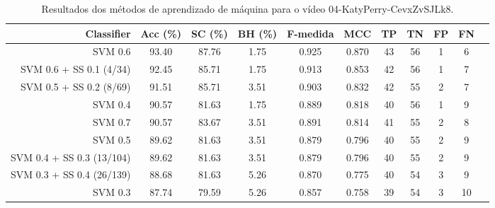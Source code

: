 \begin{table}[!htb]
\centering
\caption{Resultados dos métodos de aprendizado de máquina para o vídeo 04-KatyPerry-CevxZvSJLk8.}
\label{tab:04-KatyPerry-CevxZvSJLk8}
\begin{tabular}{r|c|c|c|c|c|c|c|c|c|c}
\hline\hline
Classifier & Acc (\%) & SC (\%) & BH (\%) & F-medida & MCC & TP & TN & FP & FN \\ \hline
SVM 0.6 & 93.40 & 87.76 & 1.75 & 0.925 & 0.870 & 43 & 56 & 1 & 6 \\ 
SVM 0.6 + SS 0.1 (4/34) & 92.45 & 85.71 & 1.75 & 0.913 & 0.853 & 42 & 56 & 1 & 7 \\ 
SVM 0.5 + SS 0.2 (8/69) & 91.51 & 85.71 & 3.51 & 0.903 & 0.832 & 42 & 55 & 2 & 7 \\ 
SVM 0.4 & 90.57 & 81.63 & 1.75 & 0.889 & 0.818 & 40 & 56 & 1 & 9 \\ 
SVM 0.7 & 90.57 & 83.67 & 3.51 & 0.891 & 0.814 & 41 & 55 & 2 & 8 \\ 
SVM 0.5 & 89.62 & 81.63 & 3.51 & 0.879 & 0.796 & 40 & 55 & 2 & 9 \\ 
SVM 0.4 + SS 0.3 (13/104) & 89.62 & 81.63 & 3.51 & 0.879 & 0.796 & 40 & 55 & 2 & 9 \\ 
SVM 0.3 + SS 0.4 (26/139) & 88.68 & 81.63 & 5.26 & 0.870 & 0.775 & 40 & 54 & 3 & 9 \\ 
SVM 0.3 & 87.74 & 79.59 & 5.26 & 0.857 & 0.758 & 39 & 54 & 3 & 10 \\ 
\hline\hline
\end{tabular}
\end{table}
